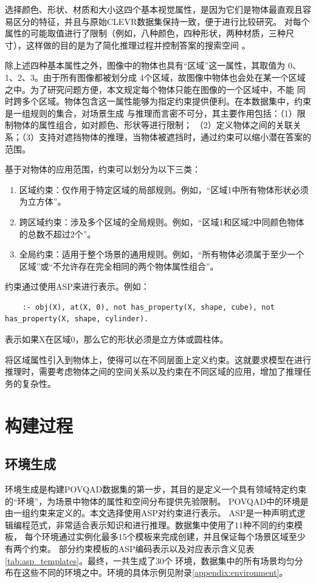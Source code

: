 选择颜色、形状、材质和大小这四个基本视觉属性，是因为它们是物体最直观且容易区分的特征，并且与原始CLEVR数据集保持一致，便于进行比较研究。
对每个属性的可能取值进行了限制（例如，八种颜色，四种形状，两种材质，三种尺寸），这样做的目的是为了简化推理过程并控制答案的搜索空间 。

除上述四种基本属性之外，图像中的物体也具有“区域”这一属性，其取值为 0、1、2、3。由于所有图像都被划分成
4个区域，故图像中物体也会处在某一个区域之中。为了研究问题方便，本文规定每个物体只能在图像的一个区域中，不能
同时跨多个区域。物体包含这一属性能够为指定约束提供便利。在本数据集中，约束是一组规则的集合，对场景生成
与推理而言密不可分，其主要作用包括：（1）限制物体的属性组合，如对颜色、形状等进行限制；
（2）定义物体之间的关联关系；（3）支持对遮挡物体的推理，当物体被遮挡时，通过约束可以缩小潜在答案的范围。

基于对物体的应用范围，约束可以划分为以下三类：
\begin{enumerate}[itemsep=0pt,parsep=0pt]
    \item 区域约束：仅作用于特定区域的局部规则。例如，“区域1中所有物体形状必须为立方体”。
    \item 跨区域约束：涉及多个区域的全局规则。例如，“区域1和区域2中同颜色物体的总数不超过2个”。
    \item 全局约束：适用于整个场景的通用规则。例如，“所有物体必须属于至少一个区域”或“不允许存在完全相同的两个物体属性组合”。
\end{enumerate}

约束通过使用ASP来进行表示。例如：
\begin{lstlisting}
    :- obj(X), at(X, 0), not has_property(X, shape, cube), not has_property(X, shape, cylinder).
\end{lstlisting}
表示如果X在区域0，那么它的形状必须是立方体或圆柱体。

将区域属性引入到物体上，使得可以在不同层面上定义约束。这就要求模型在进行推理时，需要考虑物体之间的空间关系以及约束在不同区域的应用，增加了推理任务的复杂性。
\section{构建过程}
\subsection{环境生成}
环境生成是构建POVQAD数据集的第一步，其目的是定义一个具有领域特定约束的“环境”，为场景中物体的属性和空间分布提供先验限制。
POVQAD中的环境是由一组约束来定义的。本文选择使用ASP对约束进行表示。
ASP是一种声明式逻辑编程范式，非常适合表示知识和进行推理。数据集中使用了11种不同的约束模板，
每个环境通过实例化最多15个模板来完成创建，并且保证每个场景区域至少有两个约束。
部分约束模板的ASP编码表示以及对应表示含义见表\ref{tab:asp_templates}。最终，一共生成了30个
环境，数据集中的所有场景均匀分布在这些不同的环境之中。环境的具体示例见附录\ref{appendix:environment}。

